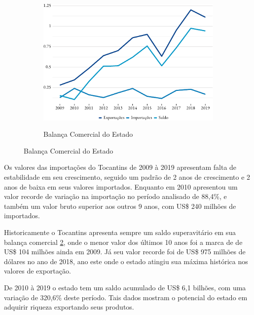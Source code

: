 \begin{figure}[!h]
		\begin{subfigure}{\linewidth}
		\caption{Balança Comercial do Estado}
		\includegraphics{fig/total-1.pdf}
		\label{fig:balanca}
	\end{subfigure}
\end{figure}


\par Os valores das importações do Tocantins de 2009 à 2019 apresentam falta de estabilidade em seu crescimento, seguido um padrão de 2 anos de crescimento e 2 anos de baixa em seus valores importados. Enquanto em 2010 apresentou um valor recorde de variação na importação no período analisado de 88,4\%, e também um valor bruto superior aos outros 9 anos, com US\$ 240 milhões de importados.

\par Historicamente o Tocantins apresenta sempre um saldo superavitário em sua balança comercial \ref{fig:balanca}, onde o menor valor dos últimos 10 anos foi a marca de de US\$ 104 milhões ainda em 2009. Já seu valor recorde foi de US\$ 975 milhões de dólares no ano de 2018, ano este onde o estado atingiu sua máxima histórica nos valores de exportação.

\par De 2010 à 2019 o estado tem um saldo acumulado de US\$ 6,1 bilhões, com uma variação de 320,6\% deste período. Tais dados mostram o potencial do estado em adquirir riqueza exportando seus produtos.

